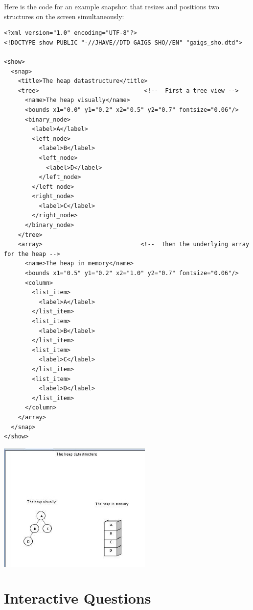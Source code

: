 \documentclass[11pt,letterpaper]{book}
\begin{document}
Here is the code for an example snapshot that resizes and positions
two structures on the screen simultaneously:

\footnotesize \begin{verbatim}
<?xml version="1.0" encoding="UTF-8"?>
<!DOCTYPE show PUBLIC "-//JHAVE//DTD GAIGS SHO//EN" "gaigs_sho.dtd">

<show>
  <snap>
    <title>The heap datastructure</title>
    <tree>                              <!--  First a tree view -->
      <name>The heap visually</name>
      <bounds x1="0.0" y1="0.2" x2="0.5" y2="0.7" fontsize="0.06"/>
      <binary_node>
        <label>A</label>
        <left_node>
          <label>B</label>
          <left_node>
            <label>D</label>
          </left_node>
        </left_node>
        <right_node>
          <label>C</label>
        </right_node>
      </binary_node>
    </tree>
    <array>                            <!--  Then the underlying array for the heap -->
      <name>The heap in memory</name>
      <bounds x1="0.5" y1="0.2" x2="1.0" y2="0.7" fontsize="0.06"/>
      <column>
        <list_item>
          <label>A</label>
        </list_item>
        <list_item>
          <label>B</label>
        </list_item>
        <list_item>
          <label>C</label>
        </list_item>
        <list_item>
          <label>D</label>
        </list_item>
      </column>
    </array>
  </snap>
</show>
\end{verbatim} \normalsize


\begin{center}
  \includegraphics[width=3in]{howto_graphics/bounds.eps}
\end{center}





\section{Interactive Questions}
\end{document}

